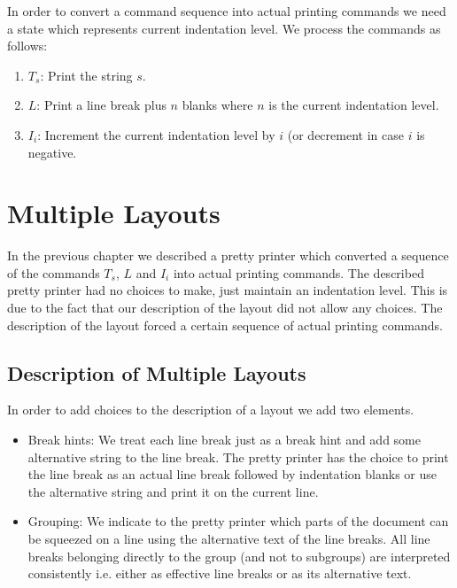 \documentclass[12pt]{article}
\begin{document}
In order to convert a command sequence into actual printing commands we need a
state which represents current indentation level. We process the commands as
follows:
\begin{enumerate}
\item $T_s$: Print the string $s$.

\item $L$: Print a line break plus $n$ blanks where $n$ is the current
  indentation level.

\item $I_i$: Increment the current indentation level by $i$ (or decrement in
  case $i$ is negative.
\end{enumerate}





\section{Multiple Layouts}

In the previous chapter we described a pretty printer which converted a
sequence of the commands $T_s$, $L$ and $I_i$ into actual printing
commands. The described pretty printer had no choices to make, just maintain
an indentation level. This is due to the fact that our description of the
layout did not allow any choices. The description of the layout forced a
certain sequence of actual printing commands.




\subsection{Description of Multiple Layouts}

In order to add choices to the description of a layout we add two elements.

\begin{itemize}

\item Break hints: We treat each line break just as a break hint and add some
  alternative string to the line break. The pretty printer has the choice to
  print the line break as an actual line break followed by indentation blanks
  or use the alternative string and print it on the current line.

\item Grouping: We indicate to the pretty printer which parts of the document
  can be squeezed on a line using the alternative text of the line breaks. All
  line breaks belonging directly to the group (and not to subgroups) are
  interpreted consistently i.e. either as effective line breaks or as its
  alternative text.
\end{itemize}
\end{document}
